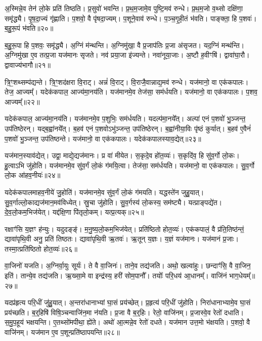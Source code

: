 अ॒स्मिन्ने॒व तेन॑ लो॒के प्रति॑ तिष्ठति।
प्र॒सुवो॑ भवन्ति।
प्र॒थ॒म॒जामे॒व पुष्टि॒मव॑ रुन्धे।
प्र॒थ॒म॒जो व॒थ्सो दक्षि॑णा॒ समृ॑द्ध्यै।
पृ॒ष॒दा॒ज्यं गृ॑ह्णाति।
प॒शवो॒ वै पृ॑षदा॒ज्यम्।
प॒शूने॒वाव॑ रुन्धे।
प॒ञ्च॒गृ॒ही॒तं भ॑वति।
पाङ्क्ता॒ हि प॒शवः॑।
ब॒हु॒रू॒पं भ॑वति॥२०॥\ip

ब॒हु॒रू॒पा हि प॒शवः॒ समृ॑द्ध्यै।
अ॒ग्निं म॑न्थन्ति।
अ॒ग्निमु॑खा॒ वै प्र॒जा\-प॑तिः प्र॒जा अ॑\-सृजत।
यद॒ग्निं मन्थ॑न्ति।
अ॒ग्निमु॑खा ए॒व तत्प्र॒जा यज॑मानः \-सृजते।
नव॑ प्रया॒जा इ॑ज्यन्ते।
नवा॑नूया॒जाः।
अ॒ष्टौ ह॒वीꣳषि॑।
द्वावा॑घा॒रौ।
द्वावाज्य॑\-भागौ॥२१॥\ip

त्रि॒ꣳ॒शथ्सम्प॑द्यन्ते।
त्रि॒ꣳ॒शद॑क्षरा वि॒राट्।
अन्नं॑ वि॒राट्।
वि॒राजै॒वान्नाद्य॒मव॑ रुन्धे।
यज॑मानो॒ वा एक॑कपालः।
तेज॒ आज्यम्᳚।
यदेक॑कपाल॒ आज्य॑मा॒नय॑ति।
यज॑मानमे॒व तेज॑सा॒ सम॑र्धयति।
यज॑मानो॒ वा एक॑कपालः।
प॒शव॒ आज्यम्᳚॥२२॥\ip

यदेक॑कपाल॒ आज्य॑मा॒नय॑ति।
यज॑मानमे॒व प॒शुभिः॒ सम॑र्धयति।
यदल्प॑मा॒नये᳚त्।
अल्पा॑ एनं प॒शवो॑ भु॒ञ्जन्त॒ उप॑तिष्ठेरन्।
यद्ब॒ह्वा॑नये᳚त्।
ब॒हव॑ एनं प॒शवो\-ऽभु॑ञ्जन्त॒ उप॑तिष्ठेरन्।
ब॒ह्वा॑नीया॒विः पृ॑ष्ठं कुर्यात्।
ब॒हव॑ ए॒वैनं॑ प॒शवो॑ भु॒ञ्जन्त॒ उप॑तिष्ठन्ते।
यज॑मानो॒ वा एक॑कपालः।
यदेक॑कपालस्याव॒द्येत्॥२३॥\ip

यज॑मान॒स्याव॑द्येत्।
उद्वा॒ माद्ये॒द्यज॑मानः।
प्र वा॑ मीयेत।
स॒कृदे॒व हो॑त॒व्यः॑।
स॒कृदि॑व॒ हि सु॑व॒र्गो लो॒कः।
हु॒त्वाऽभि जु॑होति।
यज॑मानमे॒व सु॑व॒र्गं लो॒कं ग॑मयि॒त्वा।
तेज॑सा॒ सम॑र्धयति।
यज॑मानो॒ वा एक॑कपालः।
सु॒व॒र्गो लो॒क आ॑हव॒नीयः॑॥२४॥\ip

यदेक॑कपालमाहव॒नीये॑ जु॒होति॑।
यज॑मानमे॒व सु॑व॒र्गं लो॒कं ग॑मयति।
यद्धस्ते॑न जुहु॒यात्।
सु॒व॒र्गाल्लो॒काद्यज॑मान॒मव॑\-विध्येत्।
स्रु॒चा जु॑होति।
सु॒व॒र्गस्य॑ लो॒कस्य॒ सम॑ष्ट्यै।
यत्प्राङ्पद्ये॑त।
दे॒व॒लो॒कम॒भिज॑येत्।
यद्द॑क्षि॒णा पि॑तृलो॒कम्।
यत्प्र॒त्यक्॥२५॥\ip

रक्षाꣳ॑सि य॒ज्ञꣳ ह॑न्युः।
यदुदङ्ङ्॑।
म॒नु॒ष्य॒लो॒कम॒भिज॑येत्।
प्रति॑\-ष्ठितो होत॒व्यः॑।
एक॑कपालं॒ वै प्र॑ति॒तिष्ठ॑न्तं॒ द्यावा॑पृथि॒वी अनु॒ प्रति॑ तिष्ठतः।
द्यावा॑पृथि॒वी ऋ॒तवः॑।
ऋ॒तून् य॒ज्ञः।
य॒ज्ञं यज॑मानः।
यज॑मानं प्र॒जाः।
तस्मा॒त्प्रति॑\-ष्ठितो होत॒व्यः॑॥२६॥\ip

वा॒जिनो॑ यजति।
अ॒ग्निर्वा॒युः सूर्यः॑।
ते वै वा॒जिनः॑।
ताने॒व तद्य॑जति।
अथो॒ खल्वा॑हुः।
छन्दाꣳ॑सि॒ वै वा॒जिन॒ इति॑।
तान्ये॒व तद्य॑जति।
ऋ॒ख्सा॒मे वा इन्द्र॑स्य॒ हरी॑ सोम॒पानौ᳚।
तयोः᳚ परि॒धय॑ आ॒धानम्᳚।
वाजि॑नं भाग॒धेयम्᳚॥२७॥\ip

यदप्र॑हृत्य परि॒धीं जु॑हु॒यात्।
अ॒न्तरा॑धानाभ्यां घा॒सं प्रय॑च्छेत्।
प्र॒हृत्य॑ परि॒धीं जु॑होति।
निरा॑धानाभ्यामे॒व घा॒सं प्रय॑च्छति।
ब॒र्॒हिषि॑ विषि॒ञ्चन्वाजि॑न॒मा न॑यति।
प्र॒जा वै ब॒र्॒हिः।
रेतो॒ वाजि॑नम्।
प्र॒जास्वे॒व रेतो॑ दधाति।
स॒मु॒प॒हूय॑ भक्षयन्ति।
ए॒तथ्सो॑मपीथा॒ ह्ये॑ते।
अथो॑ आ॒त्मन्ने॒व रेतो॑ दधते।
यज॑मान उत्त॒मो भ॑क्षयति।
प॒शवो॒ वै वाजि॑नम्।
यज॑मान ए॒व प॒शून्प्रति॑\-ष्ठापयन्ति॥२८॥\ip\anuvakamend[लो॒को ब॑हुरू॒पं भ॑व॒त्याज्य॑\-भागौ प॒शव॒ आज्य॑मव॒द्येदा॑हव॒नीयः॑ प्र॒त्यक्तस्मा॒त्प्रति॑\-ष्ठितो होत॒व्यो॑ भाग॒धेय॑मे॒ते च॒त्वारि॑ च]

